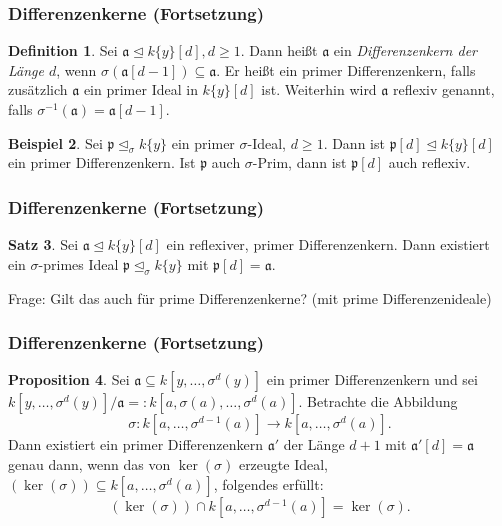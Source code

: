 \documentclass{beamer}
\def\a{\mathfrak{a}}
\def\p{\mathfrak{p}}
\def\s{\sigma}
\def\si{\unlhd_{\sigma}}
\theoremstyle{definition}
\newtheorem{satz}{Satz}[section]
\newtheorem{ex}[satz]{Beispiel}
\newtheorem{prop}[satz]{Proposition}
\newtheorem{defn}[satz]{Definition}
\begin{document}
\begin{frame}\frametitle{Differenzenkerne (Fortsetzung)}
\begin{defn}
Sei $\a \unlhd k\{y\}[d], d \geq 1$. Dann heißt $\a$ ein \emph{Differenzenkern der Länge $d$}, wenn $\s(\a[d-1]) \subseteq \a$. Er heißt ein primer Differenzenkern, falls zusätzlich $\a$ ein primer Ideal in $k\{y\}[d]$ ist.
Weiterhin wird $\a$ reflexiv genannt, falls $\s^{-1}(\a) = \a[d-1]$. 
\end{defn}
\begin{ex}
Sei $\p \si k\{y\}$ ein primer $\s$-Ideal, $d \geq 1$. Dann ist $\p[d] \unlhd k\{y\}[d]$ ein primer Differenzenkern. 
Ist $\p$ auch $\s$-Prim, dann ist $\p[d]$ auch reflexiv.
\end{ex}
\end{frame}

\begin{frame}\frametitle{Differenzenkerne (Fortsetzung)}
\begin{satz}
Sei $\a \unlhd k\{y\}[d]$ ein reflexiver, primer Differenzenkern. Dann existiert ein $\s$-primes Ideal $\p \si k\{y\}$
mit $\p[d] = \a$.
\end{satz}
$\phantom{ }$ \\
Frage: Gilt das auch für prime Differenzenkerne? (mit prime Differenzenideale)
\end{frame}

\begin{frame}\frametitle{Differenzenkerne (Fortsetzung)}
\begin{prop}
Sei $\a \subseteq k[y,\ldots,\s^d(y)]$ ein primer Differenzenkern und sei $k[y,\ldots,\s^d(y)]/\a =: k[a,\s(a),\ldots,\s^d(a)]$. Betrachte die Abbildung
\[ \s: k[a,\ldots,\s^{d-1}(a)] \rightarrow k[a,\ldots,\s^d(a)]. \]
Dann existiert ein primer Differenzenkern $\a'$ der Länge $d+1$ mit $\a'[d] = \a$ genau dann, wenn das von $\operatorname{ker}(\s)$ erzeugte Ideal, $(\operatorname{ker}(\s)) \subseteq k[a,\ldots,\s^d(a)]$, folgendes erfüllt:
 \begin{equation*} (\operatorname{ker}(\s)) \cap k[a,\ldots,\s^{d-1}(a)] = \operatorname{ker}(\s).\end{equation*} 
\end{prop}
\end{frame}
\end{document}
